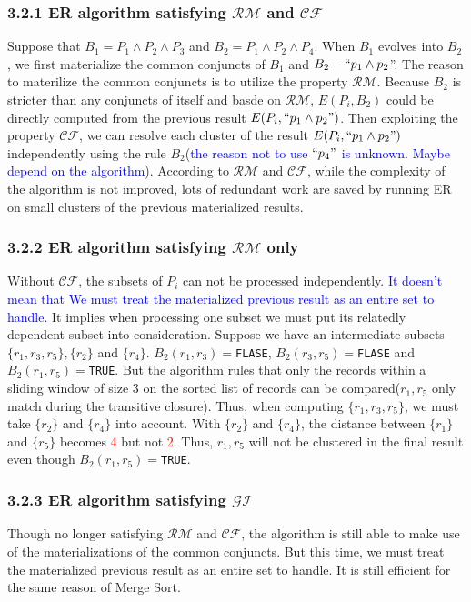 \documentclass[12pt,a4paper]{report}
\begin{document}
\subsubsection*{3.2.1 ER algorithm satisfying $\mathcal{RM}$ and $\mathcal{CF}$}
Suppose that $B_{1}=P_{1}\wedge P_{2}\wedge P_{3}$ and $B_{2}=P_{1}\wedge P_{2}\wedge P_{4}$. When $B_{1}$ evolves into $B_{2}$, we first materialize the common conjuncts of $B_{1}$ and $B_{2}- ``p_{1} \wedge p_{2}$''. The reason to materilize the common conjuncts is to utilize the property $\mathcal{RM}$. Because $B_{2}$ is stricter than any conjuncts of itself and basde on $\mathcal{RM}$, $E(P_{i}, B_{2})$ could be directly computed from the previous result $E(P_{i}, ``p_{1} \wedge p_{2}")$. Then exploiting the property $\mathcal{CF}$, we can resolve each cluster of the result $E(P_{i},``p_{1} \wedge p_{2}")$ independently using the rule $B_{2}$(\textcolor{blue}{the reason not to use $``p_{4}"$ is unknown. Maybe depend on the algorithm}). According to $\mathcal{RM}$ and $\mathcal{CF}$, while the complexity of the algorithm is not improved, lots of redundant work are saved by running ER on small clusters of the previous materialized results. 
\subsubsection*{3.2.2 ER algorithm satisfying $\mathcal{RM}$ only}
Without $\mathcal{CF}$, the subsets of $P_{i}$ can not be processed independently. \textcolor{blue}{It doesn't mean that We must treat the materialized previous result as an entire set to handle.} It implies when processing one subset we must put its relatedly dependent subset into consideration. Suppose we have an intermediate subsets $\{r_{1}, r_{3}, r_{5}\}, \{r_{2}\}$ and $\{r_{4}\}$. $B_{2}(r_{1},r_{3})=$\texttt{FLASE},  $B_{2}(r_{3},r_{5})=$\texttt{FLASE} and $B_{2}(r_{1},r_{5})=$\texttt{TRUE}. But the algorithm rules that only the records within a sliding window of size 3 on the sorted list of records can be compared($r_{1},r_{5}$ only match during the transitive closure). Thus, when computing $\{r_{1}, r_{3}, r_{5}\}$, we must take $\{r_{2}\}$ and $\{r_{4}\}$ into account. With  $\{r_{2}\}$ and $\{r_{4}\}$, the distance between $\{r_{1}\}$ and $\{r_{5}\}$ becomes \textcolor{red}{4} but not \textcolor{red}{2}. Thus, $r_{1}, r_{5}$ will not be clustered in the final result even though  $B_{2}(r_{1},r_{5})=$\texttt{TRUE}.
\subsubsection*{3.2.3 ER algorithm satisfying $\mathcal{GI}$}
Though no longer satisfying $\mathcal{RM}$ and $\mathcal{CF}$, the algorithm is still able to make use of the materializations of the common conjuncts. But this time, we must treat the materialized previous result as an entire set to handle. It is still efficient for the same reason of Merge Sort.
\end{document}
